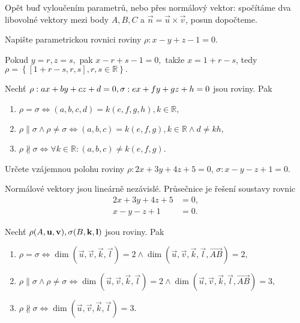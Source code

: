 \begin{reseni}
Opět buď vyloučením parametrů, nebo přes normálový vektor: spočítáme dva libovolné vektory
mezi body $A,B,C$ a $\vec n = \vec u \times \vec v$, posun dopočteme.
\end{reseni}

\begin{priklad}
Napište parametrickou rovnici roviny $\rho: x-y+z-1=0.$
\end{priklad}

\begin{reseni}
Pokud $y=r, z=s,$ pak $x-r+s-1=0,$ takže $x=1+r-s$, tedy $\rho = \left \{ [1+r-s,r,s],r,s\in \mathbb R \right \}. $
\end{reseni}

\begin{veta}
    Nechť $\rho: ax+by+cz\linebreak+ d=0, \sigma: ex+fy+gz+h=0$ jsou roviny. Pak
    \begin{enumerate}[$i.$]
    \item $\rho = \sigma \iff (a,b,c,d) = k(e,f,g,h), k\in \mathbb R,$
   	\item $\rho \parallel \sigma \land \rho \ne \sigma \iff (a,b,c) = k(e,f,g), k\in \mathbb R
    \land d\ne kh,$
   	\item $\rho \nparallel \sigma \iff \forall k \in \mathbb R: (a,b,c) \ne k(e,f,g)$.
    \end{enumerate}
\end{veta}

\begin{priklad}
Určete vzájemnou polohu roviny $\rho:2x+3y+4z+5=0$, $\sigma: x-y-z+1=0$.
\end{priklad}

\begin{reseni}
Normálové vektory jsou lineárně nezávislé. Průsečnice je řešení soustavy rovnic
\begin{align*}
    2x+3y+4z+5& =0,\\
    x-y-z+1&=0.
\end{align*}
\end{reseni}

\begin{veta}
    Nechť $\rho(A,\vec u, \vec v), \linebreak\sigma(B,\vec k, \vec l)$ jsou roviny. Pak
    \begin{enumerate}[$i.$]
    \item $\rho = \sigma \iff \dim (\vec u, \vec v, \vec k, \vec l) = 2 \land \dim (\vec u, \vec v, \vec k, \vec l, \overrightarrow{AB})=2,$
   	\item $\rho \parallel \sigma \land \rho \ne \sigma \iff \dim (\vec u, \vec v, \vec k, \vec l) = 2 \land \dim (\vec u, \vec v, \vec k, \vec l, \overrightarrow{AB})=3,$
   	\item $\rho \nparallel \sigma \iff \dim (\vec u, \vec v, \vec k, \vec l) = 3$.
    \end{enumerate}
\end{veta}

